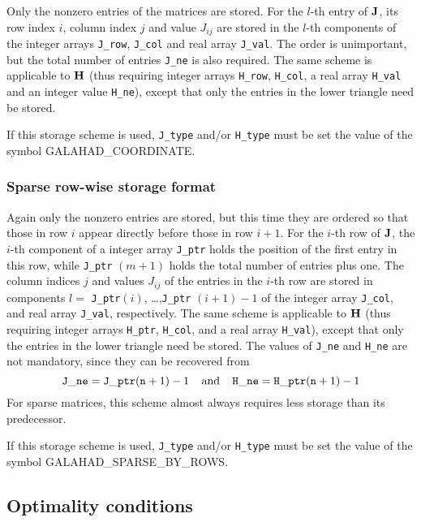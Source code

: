 \documentclass{galahad}
\newcommand{\sym}{\sf\small}
\begin{document}
Only the nonzero entries of the matrices are stored. For the 
$l$-th entry of ${\mathbf{J}}$, its row index $i$, column index $j$ 
and value $J_{ij}$
are stored in the $l$-th components of the integer arrays {\tt J\_row}, 
{\tt J\_col} and real array {\tt J\_val}. 
The order is unimportant, but the total
number of entries {\tt J\_ne} is also required. 
The same scheme is applicable to
${\mathbf{H}}$ (thus requiring integer arrays {\tt H\_row}, {\tt H\_col}, a real array 
{\tt H\_val} and an integer value {\tt H\_ne}),
except that only the entries in the lower triangle need be stored.

\noindent
If this storage scheme is used, {\tt J\_type} and/or {\tt H\_type} must be set
the value of the symbol {\sym GALAHAD\_COORDINATE}.

\subsubsection{Sparse row-wise storage format}\label{rowwise}

Again only the nonzero entries are stored, but this time
they are ordered so that those in row $i$ appear directly before those
in row $i+1$. For the $i$-th row of ${\mathbf{J}}$, the $i$-th component of a 
integer array {\tt J\_ptr} holds the position of the first entry in this row,
while {\tt J\_ptr} $(m+1)$ holds the total number of entries plus one.
The column indices $j$ and values $J_{ij}$ of the entries in the $i$-th row 
are stored in components 
$l =$ {\tt J\_ptr}$(i)$, \ldots ,{\tt J\_ptr} $(i+1)-1$ of the 
integer array {\tt J\_col}, and real array {\tt J\_val}, respectively. 
The same scheme is applicable to
${\mathbf{H}}$ (thus requiring integer arrays {\tt H\_ptr}, {\tt H\_col}, and 
a real array {\tt H\_val}),
except that only the entries in the lower triangle need be stored.
The values of {\tt J\_ne} and {\tt H\_ne} are not mandatory, since they can be
recovered from
\[
{\tt J\_ne} = {\tt J\_ptr}({\tt n}+1) - 1
\;\;\;\; \mbox{and} \;\;\;\;
{\tt H\_ne} = {\tt H\_ptr}({\tt n}+1) - 1
\]
For sparse matrices, this scheme almost always requires less storage than 
its predecessor.

\noindent
If this storage scheme is used, {\tt J\_type} and/or {\tt H\_type} must be set
the value of the symbol {\sym GALAHAD\_SPARSE\_BY\_ROWS}.


\subsection{Optimality conditions\label{galopt}}
\end{document}
